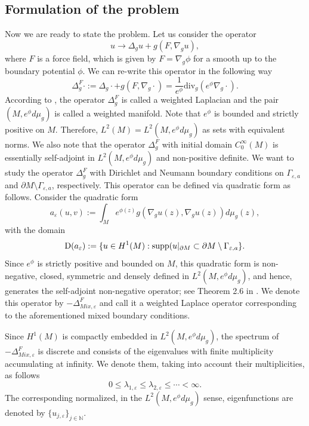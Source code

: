 \documentclass[12pt,a4paper]{amsart}
\numberwithin{equation}{section}
\theoremstyle{plain}
\theoremstyle{definition}
\begin{document}
	\subsection{Formulation of the problem}
	Now we are ready to state the problem. Let us consider the operator
	\begin{equation*}
		u \rightarrow \Delta_gu + g(F,\nabla_gu),
	\end{equation*}
	where $F$ is a force field, which is given by $F=\nabla_g\phi$ for a smooth up to the boundary potential $\phi$. We can re-write this operator in the following way
	\begin{equation*}
		\Delta_{g}^F\cdot := \Delta_g\cdot + g(F,\nabla_g\cdot) = \frac{1}{e^\phi}\mathrm{div}_g(e^\phi \nabla_{g} \cdot).
	\end{equation*}
	According to  \cite{GrigoryanSaloff-Coste}, the operator $\Delta_{g}^F$ is called a weighted Laplacian and the pair $(M,e^\phi d\mu_g)$ is called a weighted manifold. Note that $e^\phi$ is bounded and strictly positive on $M$. Therefore, $L^2(M) = L^2(M,e^\phi d\mu_g)$ as sets with equivalent norms. We also note that the operator $\Delta_{g}^{F}$ with initial domain $C_0^\infty(M)$ is essentially self-adjoint in $L^2(M,e^\phi d\mu_g)$ and non-positive definite. 
	We want to study the operator $\Delta_{g}^F$ with Dirichlet and Neumann boundary conditions on $\Gamma_{\varepsilon, a}$ and $\partial M\setminus \Gamma_{\varepsilon, a}$, respectively.  This operator can be defined via quadratic form as follows. Consider the quadratic form
	\begin{equation*}
		a_{\varepsilon}(u,v) :=  \int_{M} e^{\phi(z)} g(\nabla_g u(z), \nabla_g u(z)) d\mu_g(z),
	\end{equation*}
	with the domain 
	\begin{equation*}
		\mathrm{D}(a_\varepsilon) := \{u \in H^1(M): \mathrm{supp}(u\arrowvert_{\partial M} \subset \partial M\setminus \Gamma_{\varepsilon, a} \}.
	\end{equation*}
	Since $e^{\phi}$ is strictly positive and bounded on $M$, this quadratic form is non-negative, closed, symmetric and densely defined in $L^2(M,e^\phi d\mu_g)$, and hence, generates the self-adjoint non-negative operator; see Theorem 2.6 in \cite[Ch. 6.2]{Kato}. We denote this operator by $-\Delta^F_{Mix,\varepsilon}$ and call it a weighted Laplace operator corresponding to the aforementioned mixed boundary conditions.
	
	Since $H^1(M)$ is compactly embedded in $L^2(M,e^\phi d\mu_g)$, the spectrum of $-\Delta^F_{Mix,\varepsilon}$ is discrete and consists of the eigenvalues with finite multiplicity accumulating at infinity. We denote them, taking into account their multiplicities, as follows
	\begin{equation*}
		0 \leq \lambda_{1,\varepsilon}\leq \lambda_{2,\varepsilon} \leq  \cdots < \infty.
	\end{equation*}
	The corresponding normalized, in the $L^2(M,e^\phi d\mu_g)$ sense, eigenfunctions are denoted by $\{u_{j,\varepsilon}\}_{j\in \mathbb{N}}$.
	
\end{document}
